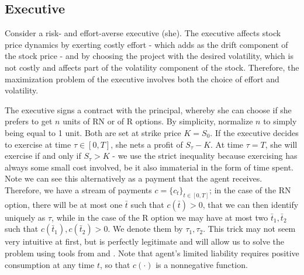 \subsection{Executive}
Consider a risk- and effort-averse executive (she). The executive affects stock price dynamics by exerting costly effort - which adds as the drift component of the stock price - and by choosing the project with the desired volatility, which is not costly and affects part of the volatility component of the stock. Therefore, the maximization problem of the executive involves both the choice of effort and volatility. 

The executive signs a contract with the principal, whereby she can choose if she prefers to get $n$ units of RN or of R options. By simplicity, normalize $n$ to simply being equal to 1 unit. %
Both are set at strike price $K = S_0$. If the executive decides to exercise at time $\tau \in [0, T]$, she nets a profit of $S_\tau - K$. At time $\tau = T$, she will exercise if and only if $S_\tau > K$ - we use the strict inequality because exercising has always some small cost involved, be it also immaterial in the form of time spent.
\\Note we can see this alternatively as a payment that the agent receives. %
Therefore, we have a stream of payments $c = \{c_t\}_{t \in [0, T]}$; in the case of the RN option, there will be at most one $\bar{t}$ such that $c(\bar{t}) > 0$, that we can then identify uniquely as $\tau$, while in the case of the R option we may have at most two $\bar{t}_1, \bar{t}_2$ such that $c(\bar{t}_1), c(\bar{t}_2) > 0$. We denote them by $\tau_1, \tau_2$.
This trick may not seem very intuitive at first, but is perfectly legitimate and will allow us to solve the problem using tools from \cite{sannikov2008continuous} and \cite{cvitanic2013dynamics}. Note that agent's limited liability requires positive consumption at any time $t$, so that $c(\cdot)$ is a nonnegative function.

